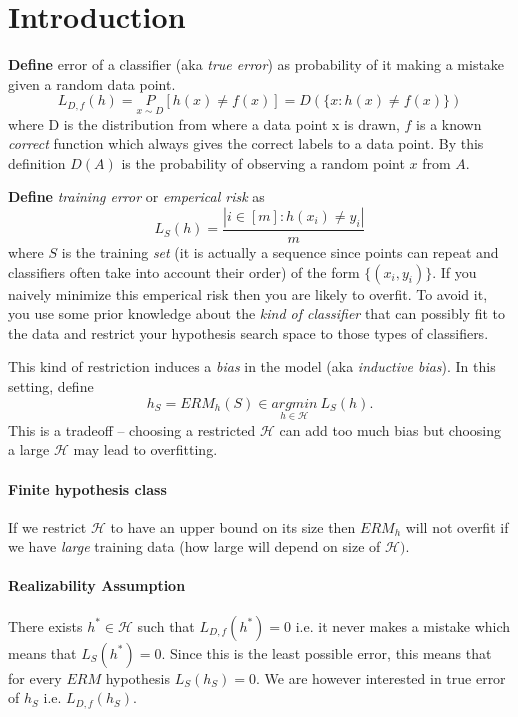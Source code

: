\section{Introduction}
\textbf{Define} error of a classifier (aka \textit{true error}) as probability of it making a mistake given a random data point.
\[
    L_{D,f}(h) = \underset{x \sim D}P[h(x) \neq f(x)] = D(\{x: h(x) \neq f(x)\})
\]
where D is the distribution from where a data point x is drawn, $f$ is a known \textit{correct} function which always gives the correct labels to a data point. By this definition $D(A)$ is the probability of observing a random point $x$ from $A$.

\textbf{Define} \textit{training error} or \textit{emperical risk} as 
\[
    L_S(h) = \frac{|i \in [m]: h(x_i) \neq y_i|}{m}
\]
where $S$ is the training \textit{set} (it is actually a sequence since points can repeat and classifiers often take into account their order) of the form $\{(x_i, y_i)\}$. If you naively minimize this emperical risk then you are likely to overfit. To avoid it, you use some prior knowledge about the \textit{kind of classifier} that can possibly fit to the data and restrict your hypothesis search space to those types of classifiers.


This kind of restriction induces a \textit{bias} in the model (aka \textit{inductive bias}). In this setting, define 
\[
    h_S = ERM_h(S) \in \underset{h \in \mathcal{H}}{argmin}~L_S(h).
\]
This is a tradeoff -- choosing a restricted $\mathcal{H}$ can add too much bias but choosing a large $\mathcal{H}$ may lead to overfitting.

\paragraph{Finite hypothesis class} If we restrict $\mathcal{H}$ to have an upper bound on its size then $ERM_h$ will not overfit if we have \textit{large} training data (how large will depend on size of $\mathcal{H})$.

\paragraph{Realizability Assumption} There exists $h^* \in \mathcal{H}$ such that $L_{D,f}(h^*) = 0$ i.e. it never makes a mistake which means that $L_S(h^*) = 0$. Since this is the least possible error, this means that for every $ERM$ hypothesis $L_S(h_S) = 0$. We are however interested in true error of $h_S$ i.e. $L_{D,f}(h_S)$.

